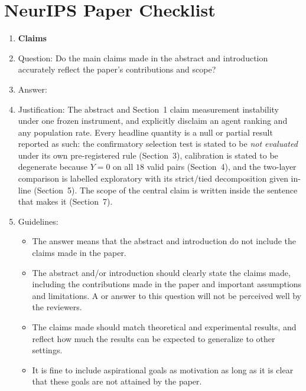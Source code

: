 \section*{NeurIPS Paper Checklist}

\begin{enumerate}

\item {\bf Claims}
    \item[] Question: Do the main claims made in the abstract and introduction accurately reflect the paper's contributions and scope?
    \item[] Answer: \answerYes{}
    \item[] Justification: The abstract and Section~1 claim measurement instability under one frozen instrument, and explicitly disclaim an agent ranking and any population rate. Every headline quantity is a null or partial result reported as such: the confirmatory selection test is stated to be \emph{not evaluated} under its own pre-registered rule (Section~3), calibration is stated to be degenerate because $Y=0$ on all $18$ valid pairs (Section~4), and the two-layer comparison is labelled exploratory with its strict/tied decomposition given in-line (Section~5). The scope of the central claim is written inside the sentence that makes it (Section~7).
    \item[] Guidelines:
    \begin{itemize}
        \item The answer \answerNA{} means that the abstract and introduction do not include the claims made in the paper.
        \item The abstract and/or introduction should clearly state the claims made, including the contributions made in the paper and important assumptions and limitations. A \answerNo{} or \answerNA{} answer to this question will not be perceived well by the reviewers. 
        \item The claims made should match theoretical and experimental results, and reflect how much the results can be expected to generalize to other settings. 
        \item It is fine to include aspirational goals as motivation as long as it is clear that these goals are not attained by the paper. 
    \end{itemize}


\end{enumerate}

